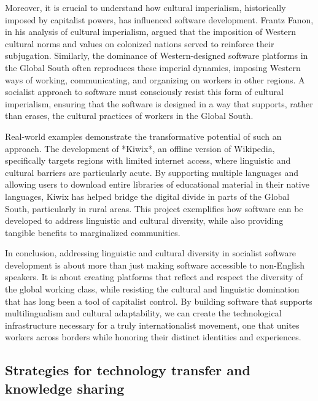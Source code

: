 \begin{refsection}
Moreover, it is crucial to understand how cultural imperialism, historically imposed by capitalist powers, has influenced software development. Frantz Fanon, in his analysis of cultural imperialism, argued that the imposition of Western cultural norms and values on colonized nations served to reinforce their subjugation. Similarly, the dominance of Western-designed software platforms in the Global South often reproduces these imperial dynamics, imposing Western ways of working, communicating, and organizing on workers in other regions. A socialist approach to software must consciously resist this form of cultural imperialism, ensuring that the software is designed in a way that supports, rather than erases, the cultural practices of workers in the Global South.

Real-world examples demonstrate the transformative potential of such an approach. The development of *Kiwix*, an offline version of Wikipedia, specifically targets regions with limited internet access, where linguistic and cultural barriers are particularly acute. By supporting multiple languages and allowing users to download entire libraries of educational material in their native languages, Kiwix has helped bridge the digital divide in parts of the Global South, particularly in rural areas. This project exemplifies how software can be developed to address linguistic and cultural diversity, while also providing tangible benefits to marginalized communities.

In conclusion, addressing linguistic and cultural diversity in socialist software development is about more than just making software accessible to non-English speakers. It is about creating platforms that reflect and respect the diversity of the global working class, while resisting the cultural and linguistic domination that has long been a tool of capitalist control. By building software that supports multilingualism and cultural adaptability, we can create the technological infrastructure necessary for a truly internationalist movement, one that unites workers across borders while honoring their distinct identities and experiences.

\cite[pp.~10-15]{lenin_self_determination} \cite[pp.~143-146]{fanon_wretched} \cite[pp.~30-33]{anderson_imagined}

\subsection{Strategies for technology transfer and knowledge sharing}


\end{refsection}
